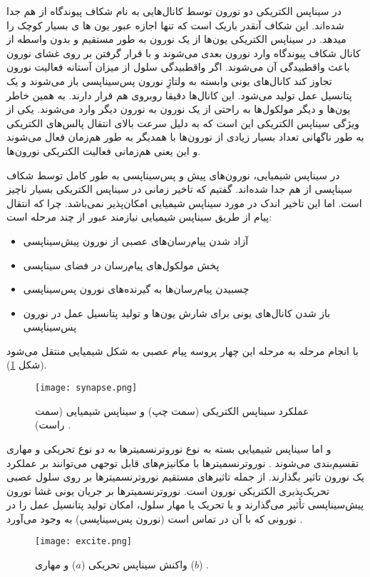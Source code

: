 در سیناپس الکتریکی دو نورون توسط کانال‌هایی به نام شکاف پیوندگاه از هم جدا شده‌اند.  این شکاف آنقدر باریک است که تنها اجازه عبور یون ها ی  بسیار کوچک را  میدهد. در سیناپس الکتریکی یون‌ها از یک نورون به طور مستقیم  و بدون واسطه از کانال شکاف پیوندگاه وارد نورون بعدی می‌شوند و با قرار گرفتن بر  روی غشای نورون باعث واقطبیدگی آن می‌شوند. اگر واقطبیدگی سلول از میزان آستانه فعالیت نورون تجاوز کند کانال‌های یونی وابسته به ولتاژِ نورون پس‌سیناپسی باز می‌شوند و یک پتانسیل عمل تولید می‌شود.  این کانال‌ها دقیقا روبروی هم قرار دارند.  به همین خاطر یون‌ها و دیگر مولکول‌ها به راحتی از یک نورون به نورون دیگر وارد می‌شوند. 
یکی از  ویژگی سیناپس الکتریکی این است که به دلیل سرعت بالای انتقال پالس‌های الکتریکی به طور ناگهانی تعداد بسیار زیادی از نورون‌ها با همدیگر به طور هم‌زمان فعال می‌شوند و این یعنی هم‌زمانی فعالیت الکتریکی نورون‌ها.

در سیناپس شیمیایی، نورون‌های پیش و پس‌سیناپسی به طور کامل توسط  شکاف سیناپسی از هم جدا شده‌اند. 
گفتیم که تاخیر زمانی در سیناپس الکتریکی بسیار ناچیز است. اما این تاخیر  اندک در مورد سیناپس شیمیایی امکان‌پذیر نمی‌باشد. چرا که انتقال پیام از طریق سیناپس شیمیایی نیازمند عبور از چند مرحله است: 
\begin{itemize}
\item آزاد شدن پیام‌رسان‌های عصبی از نورون پیش‌سیناپسی
\item پخش مولکول‌های پیام‌رسان در فضای سیناپسی
\item چسبیدن پیام‌رسان‌ها به گیرنده‌های نورون پس‌سیناپسی
\item باز شدن کانال‌های یونی برای شارش یون‌ها و تولید پتانسیل عمل در نورون پس‌سیناپسی
\end{itemize}

با انجام مرحله به مرحله این چهار پروسه پیام عصبی به شکل شیمیایی منتقل می‌شود (شکل \ref{fig:synapse}).
 \begin{figure} [htbp]
\centering
\texttt{[image: synapse.png]} 
\caption[عملکرد سیناپس الکتریکی و شیمیایی] {\footnotesize عملکرد سیناپس الکتریکی (سمت چپ) و سیناپس شیمیایی (سمت راست) \cite{kandel}.}
\label{fig:synapse}
\end{figure}

و اما سیناپس شیمیایی بسته به نوع نوروترنسمیتر‌ها به دو نوع تحریکی و مهاری تقسیم‌بندی می‌شوند \cite{lodish}. نوروترنسمیتر‌ها با مکانیزم‌های قابل توجهی می‌توانند بر عملکرد یک نورون تاثیر بگذارند. از جمله تاثیر‌های مستقیم نوروترنسمیتر‌ها بر روی سلول عصبی تحریک‌پذیری الکتریکی نورون است. نوروترنسمیتر‌ها بر جریان یونی غشا نورون پیش‌سیناپسی تأثیر می‌گذارند و با تحریک یا مهار سلول، امکان تولید پتانسیل عمل را در نورونی که با آن در تماس است (نورون پس‌سیناپسی) به وجود می‌آورد \cite{lodish}.
 \begin{figure} [htbp]
\centering
\texttt{[image: excite.png]} 
\caption[واکنش سیناپس تحریکی] {\footnotesize واکنش سیناپس تحریکی ($a$) و مهاری ($b$) \cite{lodish}.}
\label{fig:excite}
\end{figure}


